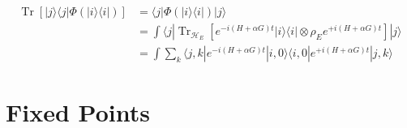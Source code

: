\documentclass{article}
\newcommand{\ket}[1]{|#1\rangle}
\newcommand{\bra}[1]{\langle #1|}
\newcommand{\ketbra}[2]{| #1\rangle\! \langle #2|}
\newcommand{\brackets}[1]{\left[ #1 \right]}
\DeclareMathOperator{\Tr}{Tr}
\newcommand{\trace}[1]{\Tr \brackets{ #1 }}
\newcommand{\partrace}[2]{\Tr_{#1} \brackets{ #2 }}
\newcommand{\hilb}{\mathcal{H}}
\begin{document}
\begin{align}
    \trace{\ketbra{j}{j} \Phi(\ketbra{i}{i})}&= \bra{j} \Phi(\ketbra{i}{i}) \ket{j} \\
    &= \int \bra{j} \partrace{\hilb_E}{e^{-i(H + \alpha G)t} \ketbra{i}{i} \otimes \rho_E e^{+i(H + \alpha G)t}} \ket{j} \\
    &= \int \sum_{k} \bra{j,k} e^{-i (H + \alpha G)t} \ketbra{i,0}{i,0} e^{+i(H + \alpha G)t} \ket{j,k}
\end{align}

\section{Fixed Points}
\end{document}
